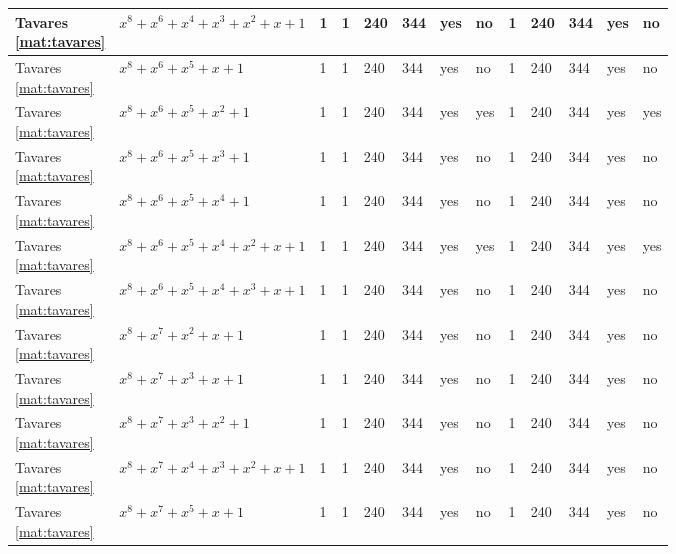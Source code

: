 \begin{tiny}
\begin{longtable}{|l|l|l|l|l|l|l|l|l|l|l|l|l|}
\shortstack{Tavares \\ \eqref{mat:tavares}} & $x^8 + x^6 + x^4 + x^3 + x^2 + x + 1$ & 1 & 1 & 240 & 344 & yes & no & 1 & 240 & 344 & yes & no \\ \hline
\shortstack{Tavares \\ \eqref{mat:tavares}} & $x^8 + x^6 + x^5 + x + 1$ & 1 & 1 & 240 & 344 & yes & no & 1 & 240 & 344 & yes & no \\ \hline
\shortstack{Tavares \\ \eqref{mat:tavares}} & $x^8 + x^6 + x^5 + x^2 + 1$ & 1 & 1 & 240 & 344 & yes & yes & 1 & 240 & 344 & yes & yes \\ \hline
\shortstack{Tavares \\ \eqref{mat:tavares}} & $x^8 + x^6 + x^5 + x^3 + 1$ & 1 & 1 & 240 & 344 & yes & no & 1 & 240 & 344 & yes & no \\ \hline
\shortstack{Tavares \\ \eqref{mat:tavares}} & $x^8 + x^6 + x^5 + x^4 + 1$ & 1 & 1 & 240 & 344 & yes & no & 1 & 240 & 344 & yes & no \\ \hline
\shortstack{Tavares \\ \eqref{mat:tavares}} & $x^8 + x^6 + x^5 + x^4 + x^2 + x + 1$ & 1 & 1 & 240 & 344 & yes & yes & 1 & 240 & 344 & yes & yes \\ \hline
\shortstack{Tavares \\ \eqref{mat:tavares}} & $x^8 + x^6 + x^5 + x^4 + x^3 + x + 1$ & 1 & 1 & 240 & 344 & yes & no & 1 & 240 & 344 & yes & no \\ \hline
\shortstack{Tavares \\ \eqref{mat:tavares}} & $x^8 + x^7 + x^2 + x + 1$ & 1 & 1 & 240 & 344 & yes & no & 1 & 240 & 344 & yes & no \\ \hline
\shortstack{Tavares \\ \eqref{mat:tavares}} & $x^8 + x^7 + x^3 + x + 1$ & 1 & 1 & 240 & 344 & yes & no & 1 & 240 & 344 & yes & no \\ \hline
\shortstack{Tavares \\ \eqref{mat:tavares}} & $x^8 + x^7 + x^3 + x^2 + 1$ & 1 & 1 & 240 & 344 & yes & no & 1 & 240 & 344 & yes & no \\ \hline
\shortstack{Tavares \\ \eqref{mat:tavares}} & $x^8 + x^7 + x^4 + x^3 + x^2 + x + 1$ & 1 & 1 & 240 & 344 & yes & no & 1 & 240 & 344 & yes & no \\ \hline
\shortstack{Tavares \\ \eqref{mat:tavares}} & $x^8 + x^7 + x^5 + x + 1$ & 1 & 1 & 240 & 344 & yes & no & 1 & 240 & 344 & yes & no \\ \hline

\end{longtable}
\end{tiny}
